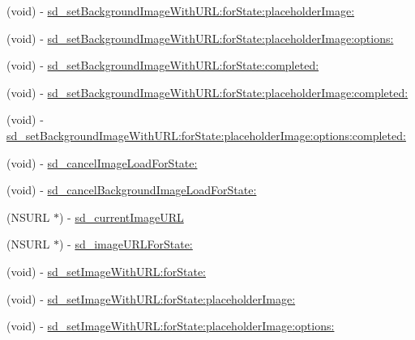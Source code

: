 \begin{DoxyCompactItemize}
\item 
(void) -\/ \mbox{\hyperlink{category_u_i_button_07_web_cache_08_a3f02643dfa92d97060eb261d7025b4ec}{sd\+\_\+set\+Background\+Image\+With\+U\+R\+L\+:for\+State\+:placeholder\+Image\+:}}
\item 
(void) -\/ \mbox{\hyperlink{category_u_i_button_07_web_cache_08_a1ef909600a987eab6fa6aaeee38f4563}{sd\+\_\+set\+Background\+Image\+With\+U\+R\+L\+:for\+State\+:placeholder\+Image\+:options\+:}}
\item 
(void) -\/ \mbox{\hyperlink{category_u_i_button_07_web_cache_08_a1c472e78e9d0fbbd9bd54b06a83813f9}{sd\+\_\+set\+Background\+Image\+With\+U\+R\+L\+:for\+State\+:completed\+:}}
\item 
(void) -\/ \mbox{\hyperlink{category_u_i_button_07_web_cache_08_a0031ef09eb759d5337914e7a5866c42f}{sd\+\_\+set\+Background\+Image\+With\+U\+R\+L\+:for\+State\+:placeholder\+Image\+:completed\+:}}
\item 
(void) -\/ \mbox{\hyperlink{category_u_i_button_07_web_cache_08_a02dc89ea855c63ac6fdbc7595f13e577}{sd\+\_\+set\+Background\+Image\+With\+U\+R\+L\+:for\+State\+:placeholder\+Image\+:options\+:completed\+:}}
\item 
(void) -\/ \mbox{\hyperlink{category_u_i_button_07_web_cache_08_a29cb6b84260cc685f2b6d7c746a014d8}{sd\+\_\+cancel\+Image\+Load\+For\+State\+:}}
\item 
(void) -\/ \mbox{\hyperlink{category_u_i_button_07_web_cache_08_a1212bebc5d1a52a7e898c96fd128191d}{sd\+\_\+cancel\+Background\+Image\+Load\+For\+State\+:}}
\item 
(N\+S\+U\+RL $\ast$) -\/ \mbox{\hyperlink{category_u_i_button_07_web_cache_08_a8ea1e28175c50110fda5b08ccbcf9475}{sd\+\_\+current\+Image\+U\+RL}}
\item 
(N\+S\+U\+RL $\ast$) -\/ \mbox{\hyperlink{category_u_i_button_07_web_cache_08_a980c6b65dd457fcf4498763dd3e79ff0}{sd\+\_\+image\+U\+R\+L\+For\+State\+:}}
\item 
(void) -\/ \mbox{\hyperlink{category_u_i_button_07_web_cache_08_ae6bef75306491d9a3131b5fed0f86d88}{sd\+\_\+set\+Image\+With\+U\+R\+L\+:for\+State\+:}}
\item 
(void) -\/ \mbox{\hyperlink{category_u_i_button_07_web_cache_08_a22f64e3eb00aa106685f88eb6a7bc982}{sd\+\_\+set\+Image\+With\+U\+R\+L\+:for\+State\+:placeholder\+Image\+:}}
\item 
(void) -\/ \mbox{\hyperlink{category_u_i_button_07_web_cache_08_af3a743db1d88006184aec45641c645d0}{sd\+\_\+set\+Image\+With\+U\+R\+L\+:for\+State\+:placeholder\+Image\+:options\+:}}

\end{DoxyCompactItemize}
